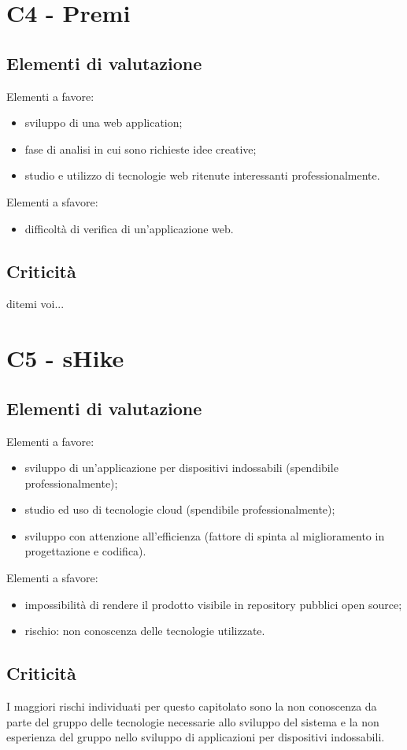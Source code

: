 \section{C4 - Premi}{
	\subsection{Elementi di valutazione}{
		Elementi a favore:
		\begin{itemize}
			\item sviluppo di una web application;
			\item fase di analisi in cui sono richieste idee creative;
			\item studio e utilizzo di tecnologie web ritenute interessanti professionalmente.
		\end{itemize}
		
		Elementi a sfavore:
		\begin{itemize}
			\item difficoltà di verifica di un'applicazione web.
		\end{itemize}
	}
	\subsection{Criticità}{
		ditemi voi...
	}
}
\section{C5 - sHike}{
	\subsection{Elementi di valutazione}{
		Elementi a favore:
		\begin{itemize}
			\item sviluppo di un'applicazione per dispositivi indossabili (spendibile professionalmente);
			\item studio ed uso di tecnologie cloud (spendibile professionalmente);
			\item sviluppo con attenzione all'efficienza (fattore di spinta al miglioramento in progettazione e codifica).
		\end{itemize}
		
		Elementi a sfavore:
		\begin{itemize}
			\item impossibilità di rendere il prodotto visibile in repository pubblici open source;
			\item rischio: non conoscenza delle tecnologie utilizzate.
		\end{itemize}
	}
	\subsection{Criticità}{
		I maggiori rischi individuati per questo capitolato sono la non conoscenza da parte del gruppo delle tecnologie necessarie allo sviluppo del sistema e la non esperienza del gruppo nello sviluppo di applicazioni per dispositivi indossabili. 
	}
}